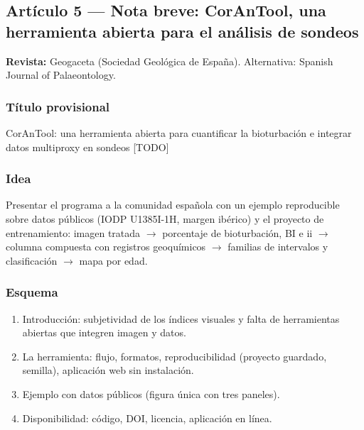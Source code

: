 \documentclass[
  10pt,
]{article}
\providecommand{\tightlist}{%
  \setlength{\itemsep}{0pt}\setlength{\parskip}{0pt}}
\begin{document}
\hypertarget{artuxedculo-5-nota-breve-corantool-una-herramienta-abierta-para-el-anuxe1lisis-de-sondeos}{%
\subsection{Artículo 5 --- Nota breve: CorAnTool, una herramienta
abierta para el análisis de
sondeos}\label{artuxedculo-5-nota-breve-corantool-una-herramienta-abierta-para-el-anuxe1lisis-de-sondeos}}

\textbf{Revista:} Geogaceta (Sociedad Geológica de España). Alternativa:
Spanish Journal of Palaeontology.

\hypertarget{tuxedtulo-provisional}{%
\subsubsection{Título provisional}\label{tuxedtulo-provisional}}

CorAnTool: una herramienta abierta para cuantificar la bioturbación e
integrar datos multiproxy en sondeos {[}TODO{]}

\hypertarget{idea-1}{%
\subsubsection{Idea}\label{idea-1}}

Presentar el programa a la comunidad española con un ejemplo
reproducible sobre datos públicos (IODP U1385I-1H, margen ibérico) y el
proyecto de entrenamiento: imagen tratada $\rightarrow$ porcentaje de bioturbación,
BI e ii $\rightarrow$ columna compuesta con registros geoquímicos $\rightarrow$ familias de
intervalos y clasificación $\rightarrow$ mapa por edad.

\hypertarget{esquema}{%
\subsubsection{Esquema}\label{esquema}}

\begin{enumerate}
\def\labelenumi{\arabic{enumi}.}
\tightlist
\item
  Introducción: subjetividad de los índices visuales y falta de
  herramientas abiertas que integren imagen y datos.
\item
  La herramienta: flujo, formatos, reproducibilidad (proyecto guardado,
  semilla), aplicación web sin instalación.
\item
  Ejemplo con datos públicos (figura única con tres paneles).
\item
  Disponibilidad: código, DOI, licencia, aplicación en línea.
\end{enumerate}
\end{document}
